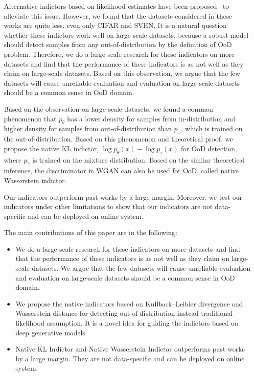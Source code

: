 \documentclass[letterpaper]{article} %
\begin{document}
Alternative indictors based on likelihood estimates have been proposed~\cite{serra2019input,song2017pixeldefend,choi2018waic,ren2019likelihood,song2019unsupervised,che2019deep} to alleviate this issue. However, we found that the datasets considered in these works are quite less, even only CIFAR and SVHN. It is a natural question whether these indictors work well on large-scale datasets, because a robust model should detect samples from any out-of-distribution by the definition of OoD problem. Therefore, we do a large-scale research for these indicators on more datasets and find that the performance of these indicators is as not well as they claim on large-scale datasets. Based on this observation, we argue that the few datasets will cause unreliable evaluation and evaluation on large-scale datasets should be a common sense in OoD domain. 

Based on the observation on large-scale datasets, we found a common phenomenon that $p_\theta$ has a lower density for samples from in-distribution and higher density for samples from out-of-distribution than $p_\omega$, which is trained on the out-of-distribution. 
Based on this phenomenon and theoretical proof, we propose the native KL indictor, $\log p_\theta(x) - \log p_\gamma(x)$ for OoD detection, where $p_\gamma$ is trained on the mixture distribution. Based on the similar theoretical inference, the discriminator in WGAN can also be used for OoD, called native Wasserstein indictor. 

Our indicators outperform past works by a large margin. Moreover, we test our indicators under other limitations to show that our indicators are not data-specific and can be deployed on online system.

The main contributions of this paper are in the following:
\begin{itemize}
	\item We do a large-scale research for these indicators on more datasets and find that the performance of these indicators is as not well as they claim on large-scale datasets. We argue that the few datasets will cause unreliable evaluation and evaluation on large-scale datasets should be a common sense in OoD domain. 
	\item We propose the native indicators based on Kullback–Leibler divergence and Wasserstein distance for detecting out-of-distribution instead traditional likelihood assumption. It is a novel idea for guiding the indictors based on deep generative models. 
	\item Native KL Indictor and Native Wasserstein Indictor outperforms past works by a large margin. They are not data-specific and can be deployed on online system.
\end{itemize}
\end{document}
